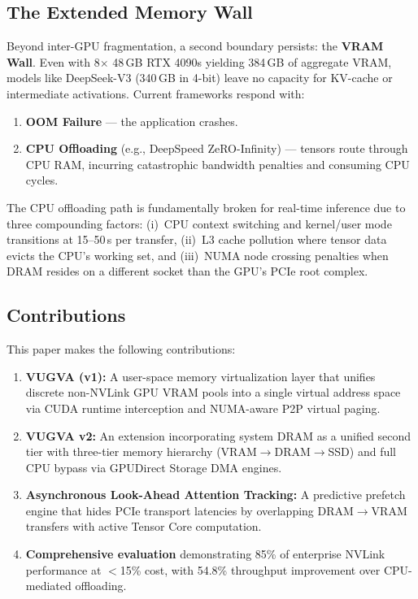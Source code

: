 \documentclass[11pt,twocolumn]{article}
\begin{document}
\subsection{The Extended Memory Wall}
Beyond inter-GPU fragmentation, a second boundary persists: the \textbf{VRAM Wall}. Even with 8$\times$ 48\,GB RTX 4090s yielding 384\,GB of aggregate VRAM, models like DeepSeek-V3 (340\,GB in 4-bit) leave no capacity for KV-cache or intermediate activations. Current frameworks respond with:

\begin{enumerate}[nosep]
    \item \textbf{OOM Failure} --- the application crashes.
    \item \textbf{CPU Offloading} (e.g., DeepSpeed ZeRO-Infinity) --- tensors route through CPU RAM, incurring catastrophic bandwidth penalties and consuming CPU cycles.
\end{enumerate}

The CPU offloading path is fundamentally broken for real-time inference due to three compounding factors: (i)~CPU context switching and kernel/user mode transitions at 15--50\,\textmu s per transfer, (ii)~L3 cache pollution where tensor data evicts the CPU's working set, and (iii)~NUMA node crossing penalties when DRAM resides on a different socket than the GPU's PCIe root complex.

\subsection{Contributions}
This paper makes the following contributions:
\begin{enumerate}[nosep]
    \item \textbf{VUGVA (v1):} A user-space memory virtualization layer that unifies discrete non-NVLink GPU VRAM pools into a single virtual address space via CUDA runtime interception and NUMA-aware P2P virtual paging.
    \item \textbf{VUGVA v2:} An extension incorporating system DRAM as a unified second tier with three-tier memory hierarchy (VRAM$\rightarrow$DRAM$\rightarrow$SSD) and full CPU bypass via GPUDirect Storage DMA engines.
    \item \textbf{Asynchronous Look-Ahead Attention Tracking:} A predictive prefetch engine that hides PCIe transport latencies by overlapping DRAM$\rightarrow$VRAM transfers with active Tensor Core computation.
    \item \textbf{Comprehensive evaluation} demonstrating 85\% of enterprise NVLink performance at $<$15\% cost, with 54.8\% throughput improvement over CPU-mediated offloading.
\end{enumerate}
\end{document}
